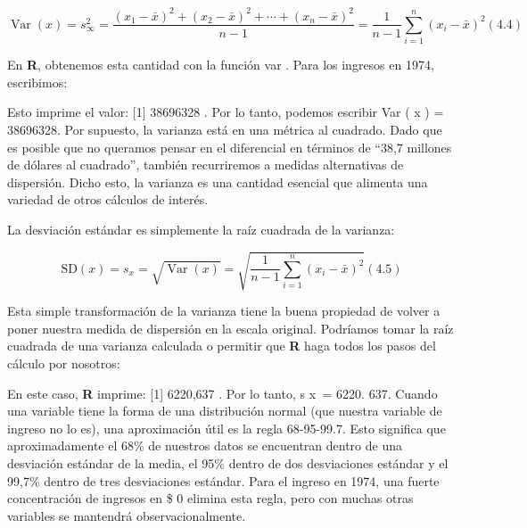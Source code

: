 \documentclass[
]{book}
\newenvironment{Shaded}{\begin{snugshade}}{\end{snugshade}}
\newcommand{\FunctionTok}[1]{\textcolor[rgb]{0.00,0.00,0.00}{#1}}
\newcommand{\NormalTok}[1]{#1}
\newcommand{\SpecialCharTok}[1]{\textcolor[rgb]{0.00,0.00,0.00}{#1}}
\begin{document}
\[
\operatorname{Var}(x)=s_{\infty}^{2}=\frac{\left(x_{1}-\bar{x}\right)^{2}+\left(x_{2}-\bar{x}\right)^{2}+\cdots+\left(x_{n}-\bar{x}\right)^{2}}{n-1}=\frac{1}{n-1} \sum_{i=1}^{n}\left(x_{i}-\bar{x}\right)^{2}
(4.4)
\]

En \textbf{R}, obtenemos esta cantidad con la función var . Para los ingresos en 1974, escribimos:

\begin{Shaded}
\end{Shaded}

Esto imprime el valor: {[}1{]} 38696328 . Por lo tanto, podemos escribir Var ( x ) = 38696328. Por supuesto, la varianza está en una métrica al cuadrado. Dado que es posible que no queramos pensar en el diferencial en términos de ``38,7 millones de dólares al cuadrado'', también recurriremos a medidas alternativas de dispersión. Dicho esto, la varianza es una cantidad esencial que alimenta una variedad de otros cálculos de interés.

La desviación estándar es simplemente la raíz cuadrada de la varianza:

\[
\mathrm{SD}(x)=s_{x}=\sqrt{\operatorname{Var}(x)}=\sqrt{\frac{1}{n-1} \sum_{i=1}^{n}\left(x_{i}-\bar{x}\right)^{2}}
(4.5)
\]

Esta simple transformación de la varianza tiene la buena propiedad de volver a poner nuestra medida de dispersión en la escala original. Podríamos tomar la raíz cuadrada de una varianza calculada o permitir que \textbf{R} haga todos los pasos del cálculo por nosotros:

\begin{Shaded}
\end{Shaded}

En este caso, \textbf{R} imprime: {[}1{]} 6220,637 . Por lo tanto, s x  = 6220. 637. Cuando una variable tiene la forma de una distribución normal (que nuestra variable de ingreso no lo es), una aproximación útil es la regla 68-95-99.7. Esto significa que aproximadamente el 68\% de nuestros datos se encuentran dentro de una desviación estándar de la media, el 95\% dentro de dos desviaciones estándar y el 99,7\% dentro de tres desviaciones estándar. Para el ingreso en 1974, una fuerte concentración de ingresos en \$ 0 elimina esta regla, pero con muchas otras variables se mantendrá observacionalmente.
\end{document}
